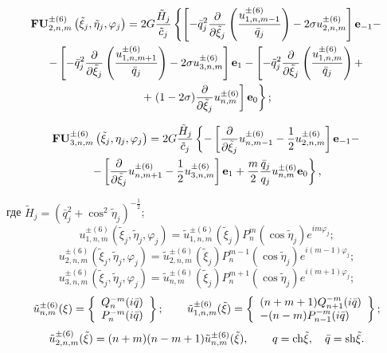 \begin{multline}
{\bf{FU}}_{2,n,m}^{ \pm (6)}\left( {{{\tilde \xi }_j},{{\tilde \eta }_j},{\varphi _j}} \right) = 2G\frac{{{{\tilde H}_j}}}{{{{\tilde c}_j}}}\left\{ {\left[ { - \bar q_j^2\frac{\partial }{{\partial {{\tilde \xi }_j}}}\left( {\frac{{u_{1,n,m - 1}^{ \pm (6)}}}{{{{\bar q}_j}}}} \right) - 2\sigma u_{2,n,m}^{ \pm (6)}} \right]{{\bf{e}}_{ - 1}} - } \right.\\
- \left[ { - \bar q_j^2\frac{\partial }{{\partial {{\tilde \xi }_j}}}\left( {\frac{{u_{1,n,m + 1}^{ \pm (6)}}}{{{{\bar q}_j}}}} \right) - 2\sigma u_{3,n,m}^{ \pm (6)}} \right]{{\bf{e}}_1} - \left[ { - \tilde q_j^2\frac{\partial }{{\partial {{\tilde \xi }_j}}}\left( {\frac{{u_{1,n,m}^{ \pm (6)}}}{{{{\bar q}_j}}}} \right) + } \right.\\
\left. { + \left. {(1 - 2\sigma )\frac{\partial }{{\partial {{\tilde \xi }_j}}}u_{n,m}^{ \pm (6)}} \right]{{\bf{e}}_0}} \right\};
\label{eq:10:26o}
\end{multline}

\begin{multline}
{\bf{FU}}_{3,n,m}^{ \pm (6)}\left( {{\tilde \xi _j},{\eta _j},{\varphi _j}} \right) = 2G\frac{{{{\tilde H}_j}}}{{{{\tilde c}_j}}}\left\{ { - \left[ {\frac{\partial }{{\partial {{\tilde \xi }_j}}}u_{n,m - 1}^{ \pm (6)} - \frac{1}{2}u_{2,n,m}^{ \pm (6)}} \right]{{\bf{e}}_{ - 1}} - } \right.\\
\left. { - \left[ {\frac{\partial }{{\partial {{\tilde \xi }_j}}}u_{n,m + 1}^{ \pm (6)} - \frac{1}{2}u_{3,n,m}^{ \pm (6)}} \right]{{\bf{e}}_1} + \frac{m}{2}\frac{{{{\bar q}_j}}}{{{q_j}}}u_{n,m}^{ \pm (6)}{{\bf{e}}_0}} \right\},
\label{eq:10:27o}
\end{multline}

где ${\tilde H_j} = {\left( {\bar q_j^2 + {{\cos }^2}{{\tilde \eta }_j}} \right)^{ - \frac{1}{2}}}$;
$$
u_{1,n,m}^{ \pm (6)}\left( {{{\tilde \xi }_j},{{\tilde \eta }_j},{\varphi _j}} \right) = \tilde u_{1,n,m}^{ \pm (6)}({\tilde \xi _j})P_n^m(\cos {\tilde \eta _j}){e^{im{\varphi _j}}};
$$
$$
u_{2,n,m}^{ \pm (6)}\left( {{{\tilde \xi }_j},{{\tilde \eta }_j},{\varphi _j}} \right) = \tilde u_{2,n,m}^{ \pm (6)}({\tilde \xi _j})P_n^{m - 1}(\cos {\tilde \eta _j}){e^{i(m - 1){\varphi _j}}};
$$
$$
u_{3,n,m}^{ \pm (6)}\left( {{{\tilde \xi }_j},{{\tilde \eta }_j},{\varphi _j}} \right) = \tilde u_{n,m}^{ \pm (6)}({\tilde \xi _j})P_n^{m + 1}(\cos {\tilde \eta _j}){e^{i(m + 1){\varphi _j}}};
$$
$$
\tilde u_{n,m}^{ \pm (6)}(\xi ) = \left\{ \begin{array}{l}
Q_n^{ - m}(i\bar q)\\
P_n^{ - m}(i\bar q)
\end{array} \right\};\qquad {\kern 1pt} \tilde u_{1,n,m}^{ \pm (6)}(\tilde \xi ) = \left\{ \begin{array}{l}
(n + m + 1)Q_{n + 1}^{ - m}(i\bar q)\\
 - (n - m)P_{n - 1}^{ - m}(i\bar q)
\end{array} \right\};
$$
$$
\tilde u_{2,n,m}^{ \pm (6)}(\tilde \xi ) = (n + m)(n - m + 1)\tilde u_{n,m}^{ \pm (6)}(\tilde \xi ),\qquad {\kern 1pt} q = {\mathop{\rm ch}\nolimits} \tilde \xi ,\quad \bar q = {\mathop{\rm sh}\nolimits} \tilde\xi.
$$

